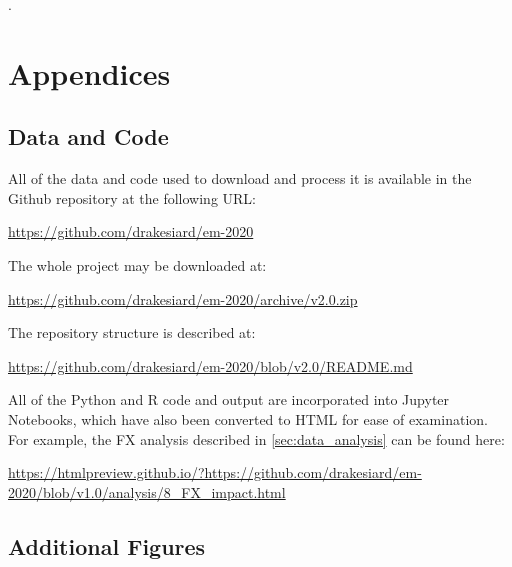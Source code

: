 \documentclass[12pt,a4paper]{article}
\begin{document}
\clearpage

\appendix

\renewcommand{\refname}{\section{References}\label{sec:references}}.


\clearpage

\section{Appendices}

\subsection{Data and Code}\label{sec:data_and_code}

All of the data and code used to download and process it is available in the Github repository at the following URL:

\url{https://github.com/drakesiard/em-2020}

\noindent
The whole project may be downloaded at:

\url{https://github.com/drakesiard/em-2020/archive/v2.0.zip}

\noindent
The repository structure is described at:

\url{https://github.com/drakesiard/em-2020/blob/v2.0/README.md}

\noindent
All of the Python and R code and output are incorporated into Jupyter Notebooks, which have also been converted to HTML for ease of examination. For example, the FX analysis described in \cref{sec:data_analysis} can be found here:

\begin{adjustbox}{max width=\textwidth}
\url{https://htmlpreview.github.io/?https://github.com/drakesiard/em-2020/blob/v1.0/analysis/8_FX_impact.html}
\end{adjustbox}

\clearpage
\subsection{Additional Figures}\label{sec:graph_appendix}

\listoffigures
\listoftables

\restoregeometry{}
\end{document}
